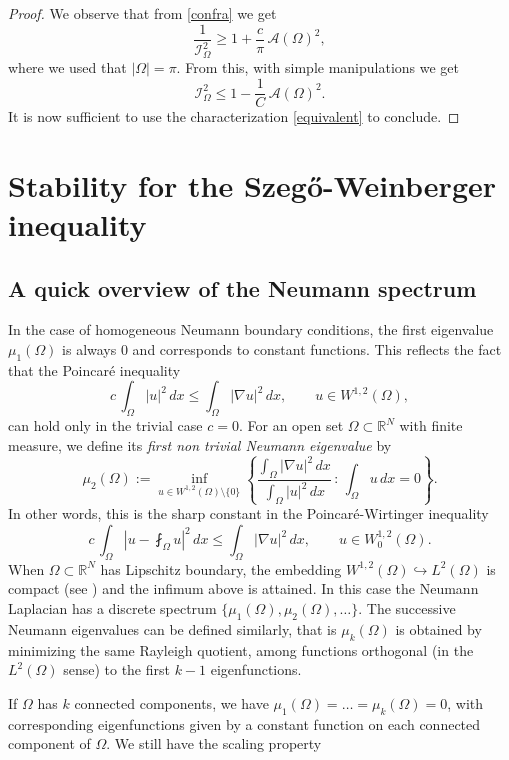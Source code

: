 \documentclass{amsart}
\theoremstyle{definition}
\numberwithin{equation}{section}
\begin{document}
\begin{proof}
We observe that from \eqref{confra} we get
\[
\frac{1}{\mathcal{I}_\Omega^2}\ge 1+\frac{c}{\pi}\,\mathcal{A}(\Omega)^2,
\]
where we used that $|\Omega|=\pi$.
From this, with simple manipulations we get
\[
\mathcal{I}_\Omega^2\le 1-\frac{1}{C}\,\mathcal{A}(\Omega)^2.
\]
It is now sufficient to use the characterization \eqref{equivalent} to conclude.
\end{proof}



\section{Stability for the Szeg\H{o}-Weinberger inequality}
\label{sec:4}

\subsection{A quick overview of the Neumann spectrum}
In the case of homogeneous Neumann boundary conditions, the first eigenvalue $\mu_1(\Omega)$ is always $0$ and corresponds to constant functions. This reflects the fact that the Poincar\'e inequality
\[
c\, \int_\Omega |u|^2\, dx\le \int_\Omega |\nabla u|^2\, dx ,\qquad u\in W^{1,2}(\Omega),
\]
can hold only in the trivial case $c=0$. For an open set $\Omega\subset\mathbb{R}^N$ with finite measure, 
we define its {\it first non trivial Neumann eigenvalue} by
\[
\mu_2(\Omega):=\inf_{u\in W^{1,2}(\Omega)\setminus\{0\}}\left\{\frac{\displaystyle\int_\Omega |\nabla u|^2\, dx}{\displaystyle\int_\Omega |u|^2\, dx}\, :\, \int_\Omega u\, dx=0\right\}.
\] 
In other words, this is the sharp constant in the Poincar\'e-Wirtinger inequality
\[
c\,\int_{\Omega} \left|u-\fint_\Omega u\right|^2\,dx\le \int_\Omega |\nabla u|^2\,dx,\qquad u\in W^{1,2}_0(\Omega).
\]
When $\Omega\subset\mathbb{R}^N$ has Lipschitz boundary, the embedding $W^{1,2}(\Omega)\hookrightarrow L^2(\Omega)$ is compact (see \cite[Theorem 5.8.2]{MR0482102}) and the infimum above is attained.
In this case the Neumann Laplacian has a discrete spectrum $\{\mu_1(\Omega),\mu_2(\Omega),\dots\}$. The successive Neumann eigenvalues can be defined similarly, that is $\mu_k(\Omega)$ is obtained by minimizing the same Rayleigh quotient, among functions orthogonal (in the $L^2(\Omega)$ sense) to the first $k-1$ eigenfunctions.
\par
If $\Omega$ has $k$ connected components, we have $\mu_1(\Omega)=\dots=\mu_k(\Omega)=0$, with corresponding eigenfunctions given by a constant function on each connected component of $\Omega$. We still have the scaling property
\end{document}
